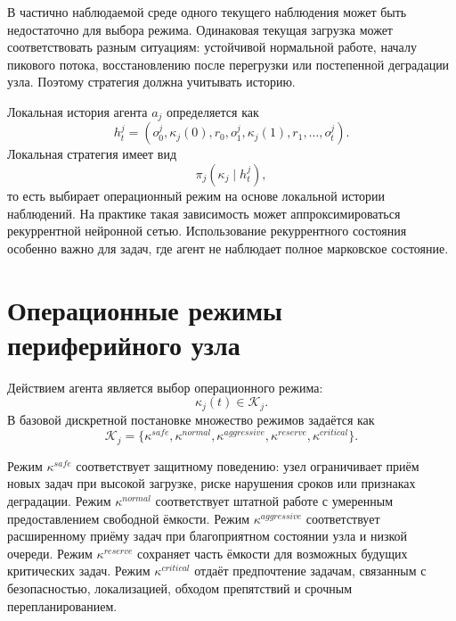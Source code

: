 В частично наблюдаемой среде одного текущего наблюдения может быть недостаточно для выбора режима. Одинаковая текущая загрузка может соответствовать разным ситуациям: устойчивой нормальной работе, началу пикового потока, восстановлению после перегрузки или постепенной деградации узла. Поэтому стратегия должна учитывать историю.

Локальная история агента $a_j$ определяется как
\begin{equation}
    h^j_t =
    \left(
        o^j_0,\kappa_j(0),r_0,
        o^j_1,\kappa_j(1),r_1,
        \ldots,
        o^j_t
    \right).
    \label{eq:ch4_local_history}
\end{equation}
Локальная стратегия имеет вид
\begin{equation}
    \pi_j(\kappa_j \mid h^j_t),
    \label{eq:ch4_local_policy}
\end{equation}
то есть выбирает операционный режим на основе локальной истории наблюдений. На практике такая зависимость может аппроксимироваться рекуррентной нейронной сетью. Использование рекуррентного состояния особенно важно для задач, где агент не наблюдает полное марковское состояние.

\section{Операционные режимы периферийного узла}

Действием агента является выбор операционного режима:
\begin{equation}
    \kappa_j(t) \in \mathcal{K}_j.
    \label{eq:ch4_action}
\end{equation}
В базовой дискретной постановке множество режимов задаётся как
\begin{equation}
    \mathcal{K}_j =
    \{
        \kappa^{safe},
        \kappa^{normal},
        \kappa^{aggressive},
        \kappa^{reserve},
        \kappa^{critical}
    \}.
    \label{eq:ch4_action_set}
\end{equation}

Режим $\kappa^{safe}$ соответствует защитному поведению: узел ограничивает приём новых задач при высокой загрузке, риске нарушения сроков или признаках деградации. Режим $\kappa^{normal}$ соответствует штатной работе с умеренным предоставлением свободной ёмкости. Режим $\kappa^{aggressive}$ соответствует расширенному приёму задач при благоприятном состоянии узла и низкой очереди. Режим $\kappa^{reserve}$ сохраняет часть ёмкости для возможных будущих критических задач. Режим $\kappa^{critical}$ отдаёт предпочтение задачам, связанным с безопасностью, локализацией, обходом препятствий и срочным перепланированием.

